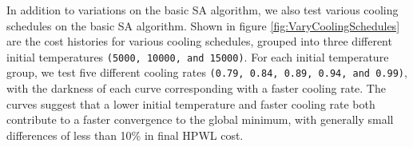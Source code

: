\begin{multicols}{2}
    In addition to variations on the basic SA algorithm, we also test various cooling schedules on the basic SA algorithm.
    Shown in figure \ref{fig:VaryCoolingSchedules} are the cost histories for various cooling schedules, grouped into three different initial temperatures \texttt{(5000, 10000, and 15000)}. 
    For each initial temperature group, we test five different cooling rates \texttt{(0.79, 0.84, 0.89, 0.94, and 0.99)}, with the darkness of each curve corresponding with a faster cooling rate.
    The curves suggest that a lower initial temperature and faster cooling rate both contribute to a faster convergence to the global minimum, with generally small differences of less than 10\% in final HPWL cost. 

\end{multicols}

